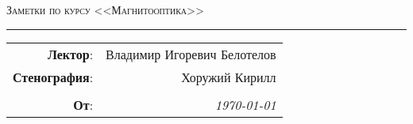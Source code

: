 
\begin{center}
    \LARGE \textsc{Заметки по курсу <<Магнитооптика>>}
\end{center}

\hrule

\phantom{42}

\begin{flushright}
    \begin{tabular}{rr}
        \textbf{Лектор}: 
        & Владимир Игоревич Белотелов \\
        \textbf{Стенография}: 
        & Хоружий Кирилл \\
        & \\
        \textbf{От}: &
        \textit{\today}\\
    \end{tabular}
\end{flushright}

\thispagestyle{empty}
\tableofcontents
\newpage
